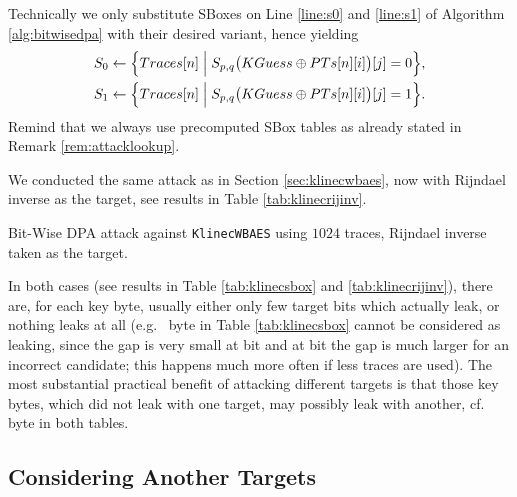 \begin{remark}
\label{rem:spq}
	Technically we only substitute SBoxes on Line \ref{line:s0} and \ref{line:s1} of Algorithm \ref{alg:bitwisedpa} with their desired variant, hence yielding
	\begin{align*}
		S_0 &\gets \Bigl\{ Traces[n] \Bigm| S_{p,q}\bigl(KGuess\oplus PTs[n][i]\bigr)[j] = 0 \Bigr\} , \\
		S_1 &\gets \Bigl\{ Traces[n] \Bigm| S_{p,q}\bigl(KGuess\oplus PTs[n][i]\bigr)[j] = 1 \Bigr\} .
	\end{align*}
	Remind that we always use precomputed SBox tables as already stated in Remark \ref{rem:attacklookup}.
\end{remark}

We conducted the same attack as in Section \ref{sec:klinecwbaes}, now with Rijndael inverse as the target, see results in Table \ref{tab:klinecrijinv}.

\begin{landscape}
\begin{table}[H]
	\begin{center}
	
	\end{center}
\caption{Bit-Wise DPA attack against {\tt KlinecWBAES} using $1024$ traces, Rijndael inverse taken as the target.}
\label{tab:klinecrijinv}
\end{table}
\end{landscape}

In both cases (see results in Table \ref{tab:klinecsbox} and \ref{tab:klinecrijinv}), there are, for each key byte, usually either only few target bits which actually leak, or nothing leaks at all (e.g.\  byte in Table \ref{tab:klinecsbox} cannot be considered as leaking, since the gap is very small at  bit and at  bit the gap is much larger for an incorrect candidate; this happens much more often if less traces are used). The most substantial practical benefit of attacking different targets is that those key bytes, which did not leak with one target, may possibly leak with another, cf.  byte in both tables.



\subsection{Considering Another Targets}
\label{sec:16targets}


